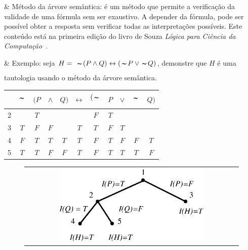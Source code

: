 \begin{easylist}
  & Método da árvore semântica: é um método que permite a verificação da validade de uma fórmula sem ser exaustivo. A depender da fórmula, pode ser possível obter a resposta sem verificar todas as interpretações possíveis. Este conteúdo está na primeira edição do livro de Souza \textit{Lógica para Ciência da Computação}~\cite{souza_logica_1}.

\clearpage
  
  & Exemplo: seja $H = \; \NOT(P \AND Q) \BIC (\NOT P \OR \NOT Q)$, demonstre que $H$ é uma tautologia usando o método da árvore semântica.
\end{easylist}

\begin{center}
  \begin{tabular}{ c|cccccccccc }
        & $\NOT$ & $(P$ & $\land$ & $Q)$ & $\leftrightarrow$ & $(\NOT$ & $P$ & $\lor$ & $\NOT$ & $Q)$ \\
    \hline
      2 &        & $T$  &        &      &        & $F$     & $T$ &       &        &      \\
    \hline
      3 & $T$    & $F$  & $F$    &      & $T$    & $T$     & $F$ & $T$   &        &      \\
    \hline
      4 & $F$    & $T$  & $T$    & $T$  & $T$    & $F$     & $T$ & $F$   & $F$    & $T$  \\
    \hline
      5 & $T$    & $T$  & $F$    & $F$  & $T$    & $F$     & $T$ & $T$   & $T$    & $F$  \\
  \end{tabular}
\end{center}

\begin{figure}[h!]
  \begin{center}
    \begin{tabular}{c}
      \includegraphics[width=0.7\textwidth]{images/04/tree_01.eps}
    \end{tabular}
  \end{center}
\end{figure}

